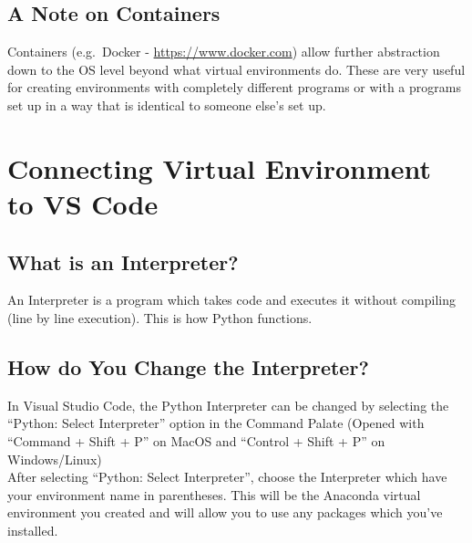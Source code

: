 \documentclass[12pt]{article}
\begin{document}
        \subsection{A Note on Containers}
            Containers (e.g.\ Docker - \url{https://www.docker.com}) allow further abstraction down to the OS level beyond what virtual environments do.
            These are very useful for creating environments with completely different programs or with a programs set up in a way that is identical to someone else's set up.
    \section{Connecting Virtual Environment to VS Code}
        \subsection{What is an Interpreter?}
            An Interpreter is a program which takes code and executes it without compiling (line by line execution). This is how Python functions.
        \subsection{How do You Change the Interpreter?}
            In Visual Studio Code, the Python Interpreter can be changed by selecting the ``Python: Select Interpreter'' option in the Command Palate (Opened with ``Command + Shift + P'' on MacOS and ``Control + Shift + P'' on Windows/Linux)
            \\After selecting ``Python: Select Interpreter'', choose the Interpreter which have your environment name in parentheses. This will be the Anaconda virtual environment you created and will allow you to use any packages which you've installed.
\end{document}
